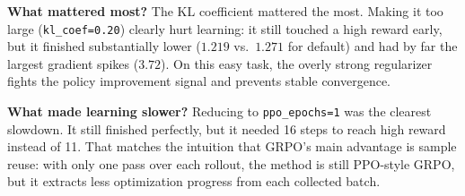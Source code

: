 \documentclass[11pt]{article}
\begin{document}
\begin{table}[H]
\centering
\small
\caption{Summary of the extra \texttt{format\_copy + GRPO} ablation runs.}
\label{tab:ablation}
\end{table}

\textbf{What mattered most?} The KL coefficient mattered the most. Making it too large (\texttt{kl\_coef=0.20}) clearly hurt learning: it still touched a high reward early, but it finished substantially lower (\(1.219\) vs.\ \(1.271\) for default) and had by far the largest gradient spikes (\(3.72\)). On this easy task, the overly strong regularizer fights the policy improvement signal and prevents stable convergence.

\textbf{What made learning slower?} Reducing to \texttt{ppo\_epochs=1} was the clearest slowdown. It still finished perfectly, but it needed 16 steps to reach high reward instead of 11. That matches the intuition that GRPO's main advantage is sample reuse: with only one pass over each rollout, the method is still PPO-style GRPO, but it extracts less optimization progress from each collected batch.
\end{document}
